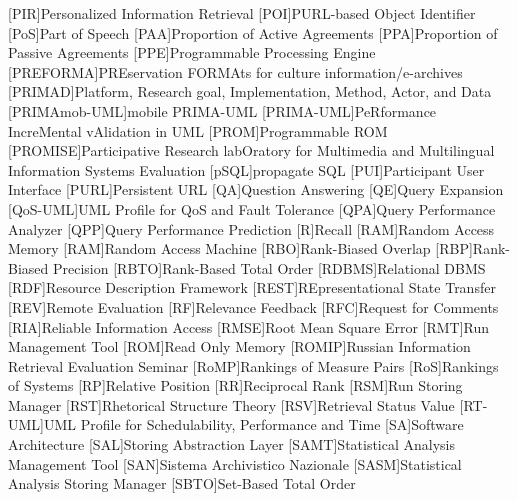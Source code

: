 [PIR]{Personalized Information Retrieval}
[POI]{\acs{PURL}-based Object Identifier}
[PoS]{Part of Speech}
[PAA]{Proportion of Active Agreements}
[PPA]{Proportion of Passive Agreements}
[PPE]{Programmable Processing Engine}
[PREFORMA]{PREservation FORMAts for culture information/e-archives}
[PRIMAD]{Platform, Research goal, Implementation, Method, Actor, and Data}
[PRIMAmob-UML]{mobile \acs{PRIMA-UML}}
[PRIMA-UML]{PeRformance IncreMental vAlidation in \acs{UML}}
[PROM]{Programmable \acs{ROM}}
[PROMISE]{Participative Research labOratory  for Multimedia and Multilingual Information Systems Evaluation}
[pSQL]{propagate \acs{SQL}}
[PUI]{Participant User Interface}
[PURL]{Persistent \acs{URL}}
[QA]{Question Answering}
[QE]{Query Expansion}
[QoS-UML]{\acs{UML} Profile for QoS and Fault Tolerance}
[QPA]{Query Performance Analyzer}
[QPP]{Query Performance Prediction}
[R]{Recall}
[RAM]{Random Access Memory}
[RAM]{Random Access Machine}
[RBO]{Rank-Biased Overlap}
[RBP]{Rank-Biased Precision}
[RBTO]{Rank-Based Total Order}
[RDBMS]{Relational \acs{DBMS}}
[RDF]{Resource Description Framework}
[REST]{REpresentational State Transfer}
[REV]{Remote Evaluation}
[RF]{Relevance Feedback}
[RFC]{Request for Comments}
[RIA]{Reliable Information Access}
[RMSE]{Root Mean Square Error}
[RMT]{Run Management Tool}
[ROM]{Read Only Memory}
[ROMIP]{Russian Information Retrieval Evaluation Seminar}
[RoMP]{Rankings of Measure Pairs}
[RoS]{Rankings of Systems}
[RP]{Relative Position}
[RR]{Reciprocal Rank}
[RSM]{Run Storing Manager}
[RST]{Rhetorical Structure Theory}
[RSV]{Retrieval Status Value}
[RT-UML]{\acs{UML} Profile for Schedulability, Performance and Time}
[SA]{Software Architecture}
[SAL]{Storing Abstraction Layer}
[SAMT]{Statistical Analysis Management Tool}
[SAN]{Sistema Archivistico Nazionale}
[SASM]{Statistical Analysis Storing Manager}
[SBTO]{Set-Based Total Order}
